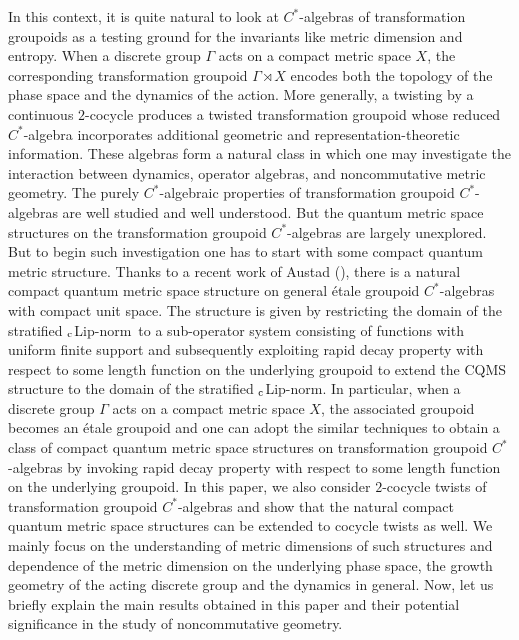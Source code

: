 \documentclass[a4paper,11pt,reqno]{amsart}
\theoremstyle{plain}
\theoremstyle{mainthmstyle}
\theoremstyle{named}
\numberwithin{equation}{section}
\newcommand{\clipnorm}{$_{\text{\rm c}}$Lip-norm}
\begin{document}
\indent In this context, it is quite natural to look at $C^{\ast}$-algebras of transformation groupoids as a testing ground for the invariants like metric dimension and entropy. When a discrete group $\Gamma$ acts on a compact metric space $X$, the corresponding transformation groupoid $\Gamma \rtimes X$ encodes both the topology of the phase space and the dynamics of the action. More generally, a twisting by a continuous $2$-cocycle produces a twisted transformation groupoid whose reduced $C^{\ast}$-algebra incorporates additional geometric and representation-theoretic information. These algebras form a natural class in which one may investigate the interaction between dynamics, operator algebras, and noncommutative metric geometry. The purely $C^{\ast}$-algebraic properties of transformation groupoid $C^{\ast}$-algebras are well studied and well understood. But the quantum metric space structures on the transformation groupoid $C^{\ast}$-algebras are largely unexplored. But to begin such investigation one has to start with some compact quantum metric structure. Thanks to a recent work of Austad (\cite{austad2026quantum}), there is a natural compact quantum metric space structure on general \'etale groupoid $C^{\ast}$-algebras with compact unit space. The structure is given by restricting the domain of the stratified \clipnorm\ to a sub-operator system consisting of functions with uniform finite support and subsequently exploiting rapid decay property with respect to some length function on the underlying groupoid to extend the CQMS structure to the domain of the stratified \clipnorm.
In particular, when a discrete group $\Gamma$ acts on a compact metric space $X$, the associated groupoid becomes an \'etale groupoid and one can adopt the similar techniques to obtain a class of compact quantum metric space structures on transformation groupoid $C^{\ast}$-algebras by invoking rapid decay property with respect to some length function on the underlying groupoid. In this paper, we also consider $2$-cocycle twists of transformation groupoid $C^{\ast}$-algebras and show that the natural compact quantum metric space structures can be extended to cocycle twists as well. We mainly focus on the understanding of metric dimensions of such structures and dependence of the metric dimension on the underlying phase space, the growth geometry of the acting discrete group and the dynamics in general. Now, let us briefly explain the main results obtained in this paper and their potential significance in the study of noncommutative geometry.\\
\end{document}
